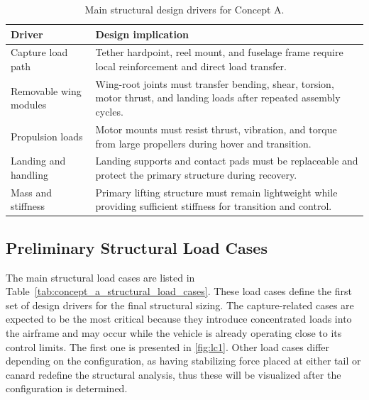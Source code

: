 \begin{table}[H]
\centering
\small
\caption{Main structural design drivers for Concept A.}
\label{tab:concept_a_structural_drivers}
\begin{tabularx}{\textwidth}{p{} X}
\toprule
\textbf{Driver} & \textbf{Design implication} \\
\midrule
Capture load path & Tether hardpoint, reel mount, and fuselage frame require local reinforcement and direct load transfer. \\
Removable wing modules & Wing-root joints must transfer bending, shear, torsion, motor thrust, and landing loads after repeated assembly cycles. \\
Propulsion loads & Motor mounts must resist thrust, vibration, and torque from large propellers during hover and transition. \\
Landing and handling & Landing supports and contact pads must be replaceable and protect the primary structure during recovery. \\
Mass and stiffness & Primary lifting structure must remain lightweight while providing sufficient stiffness for transition and control. \\
\bottomrule
\end{tabularx}
\end{table}%


\subsection{Preliminary Structural Load Cases}

The main structural load cases are listed in Table~\ref{tab:concept_a_structural_load_cases}. These load cases define the first set of design drivers for the final structural sizing. The capture-related cases are expected to be the most critical because they introduce concentrated loads into the airframe and may occur while the vehicle is already operating close to its control limits. The first one is presented in \autoref{fig:lc1}. Other load cases differ depending on the configuration, as having stabilizing force placed at either tail or canard redefine the structural analysis, thus these will be visualized after the configuration is determined.
\setlength{\tabcolsep}{2pt}
\renewcommand{\arraystretch}{1.03}
\setlength{\LTpre}{2pt}
\setlength{\LTpost}{2pt}

